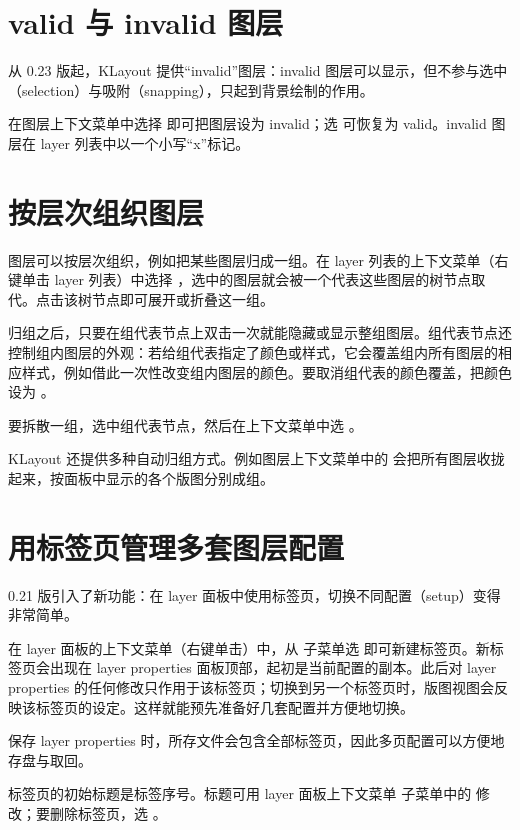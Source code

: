 \section{valid 与 invalid 图层}\label{sec:layer_validity}

从 0.23 版起，KLayout 提供“invalid”图层：invalid 图层可以显示，但不参与选中（selection）与吸附（snapping），只起到背景绘制的作用。

在图层上下文菜单中选择  即可把图层设为 invalid；选  可恢复为 valid。invalid 图层在 layer 列表中以一个小写“x”标记。

\section{按层次组织图层}\label{sec:layer_hier}

图层可以按层次组织，例如把某些图层归成一组。在 layer 列表的上下文菜单（右键单击 layer 列表）中选择 ，选中的图层就会被一个代表这些图层的树节点取代。点击该树节点即可展开或折叠这一组。

归组之后，只要在组代表节点上双击一次就能隐藏或显示整组图层。组代表节点还控制组内图层的外观：若给组代表指定了颜色或样式，它会覆盖组内所有图层的相应样式，例如借此一次性改变组内图层的颜色。要取消组代表的颜色覆盖，把颜色设为 。

要拆散一组，选中组代表节点，然后在上下文菜单中选 。

KLayout 还提供多种自动归组方式。例如图层上下文菜单中的  会把所有图层收拢起来，按面板中显示的各个版图分别成组。

\section{用标签页管理多套图层配置}\label{sec:layer_tabs}

0.21 版引入了新功能：在 layer 面板中使用标签页，切换不同配置（setup）变得非常简单。

在 layer 面板的上下文菜单（右键单击）中，从  子菜单选  即可新建标签页。新标签页会出现在 layer properties 面板顶部，起初是当前配置的副本。此后对 layer properties 的任何修改只作用于该标签页；切换到另一个标签页时，版图视图会反映该标签页的设定。这样就能预先准备好几套配置并方便地切换。

保存 layer properties 时，所存文件会包含全部标签页，因此多页配置可以方便地存盘与取回。

标签页的初始标题是标签序号。标题可用 layer 面板上下文菜单  子菜单中的  修改；要删除标签页，选 。

